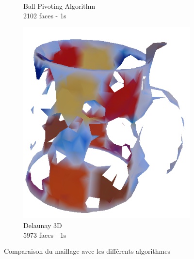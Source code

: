\documentclass[a4paper,10pt]{report}
\begin{document}
\begin{figure}[h!]
\begin{subfigure}[b]{0.3\textwidth}
        \caption{Ball Pivoting Algorithm\\2102 faces - 1s}
    \end{subfigure}
    \begin{subfigure}[b]{0.3\textwidth}
	    \includegraphics[width=\textwidth]{results/defaults-delaunay.png}
        \caption{Delaunay 3D\\5973 faces - 1s}
    \end{subfigure}
    \caption{\label{fig:meshcmp}Comparaison du maillage avec les différents algorithmes}
\end{figure}
\end{document}

